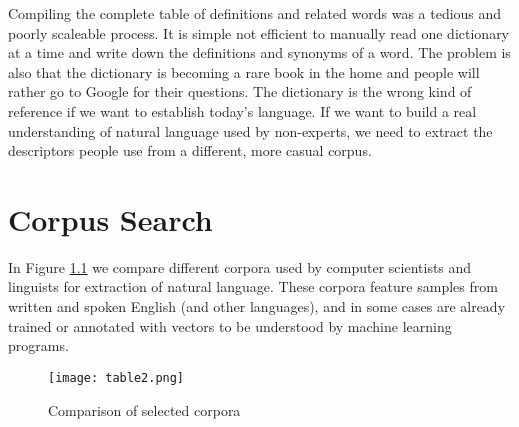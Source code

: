 \documentclass[12pt, usenames, dvipsnames]{report}
\begin{document}
\begin{flushleft}
Compiling the complete table of definitions and related words was a tedious and poorly scaleable process.
It is simple not efficient to manually read one dictionary at a time and write down the definitions and synonyms of a word.
The problem is also that the dictionary is becoming a rare book in the home and people will rather go to Google for their questions.
The dictionary is the wrong kind of reference if we want to establish today’s language.
If we want to build a real understanding of natural language used by non-experts, we need to extract the descriptors people use from a different, more casual corpus.


\chapter{Corpus Search}

In Figure \ref{tab:table2} we compare different corpora used by computer scientists and linguists for extraction of natural language.
These corpora feature samples from written and spoken English (and other languages), and in some cases are already trained or annotated with vectors to be understood by machine learning programs.

\vspace*{1.2em}
\begin{figure}[!htbp]
  \hspace*{-3.666em}
  \texttt{[image: table2.png]}
  \caption{Comparison of selected corpora}
  \label{tab:table2}
\end{figure}
\vspace*{1.2em}


\end{flushleft}
\end{document}
